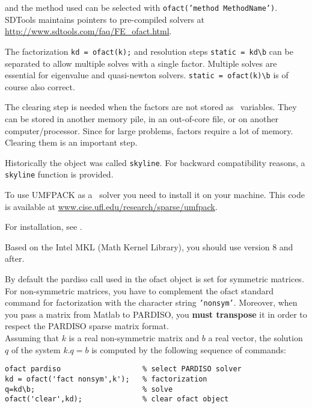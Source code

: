 %
and the method used can be selected with {\tt ofact('method MethodName')}. SDTools maintains pointers to pre-compiled solvers at \url{http://www.sdtools.com/faq/FE_ofact.html}.

The factorization {\tt kd = ofact(k);} and resolution steps {\tt static = kd\verb+\+b} can be separated to allow multiple solves with a single factor. Multiple solves are essential for eigenvalue and quasi-newton solvers. {\tt static = ofact(k)\verb+\+b} is of course also correct.

The clearing step is needed when the factors are not stored as \matlab\ variables. They can be stored in another memory pile, in an out-of-core file, or on another computer/processor. Since for large problems, factors require a lot of memory. Clearing them is an important step.

Historically the object was called {\tt skyline}. For backward compatibility reasons, a {\tt skyline} function is provided.


To use UMFPACK as a \ofact\ solver you need to install it on your machine. This code is available at \href{http://www.cise.ufl.edu/research/sparse/umfpack}{www.cise.ufl.edu/research/sparse/umfpack}.


\begin{OPENFEM}
For installation, see .\\
\end{OPENFEM}

Based on the Intel MKL (Math Kernel Library), you should use version 8 and after.

By default the pardiso call used in the ofact object is set for symmetric matrices. For non-symmetric matrices, you have to complement the ofact standard command for factorization with the character string {\tt 'nonsym'}. Moreover, when you pass a matrix from Matlab to PARDISO, you  {\bf must transpose} it in order to respect the PARDISO sparse matrix format.\\
Assuming that $k$ is a real non-symmetric matrix and $b$ a real vector, the solution $q$ of the system $k.q=b$ is computed by the following sequence of commands:

\begin{verbatim}
ofact pardiso                   % select PARDISO solver
kd = ofact('fact nonsym',k');   % factorization
q=kd\b;                         % solve
ofact('clear',kd);              % clear ofact object
\end{verbatim}

